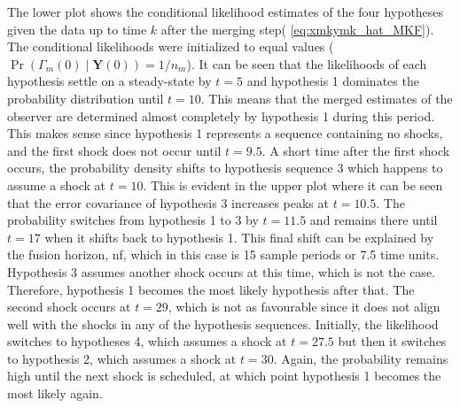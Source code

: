 The lower plot shows the conditional likelihood estimates of the four hypotheses given the data up to time $k$ after the merging step( \ref{eq:xmkymk_hat_MKF}). The conditional likelihoods were initialized to equal values ($\operatorname{Pr}\left(\Gamma_m(0) \mid \mathbf{Y}(0)\right)=1/n_m$). It can be seen that the likelihoods of each hypothesis settle on a steady-state by $t=5$ and hypothesis 1 dominates the probability distribution until $t=10$. This means that the merged estimates of the observer are determined almost completely by hypothesis 1 during this period. This makes sense since hypothesis 1 represents a sequence containing no shocks, and the first shock does not occur until $t=9.5$. A short time after the first shock occurs, the probability density shifts to hypothesis sequence 3 which happens to assume a shock at $t=10$. This is evident in the upper plot where it can be seen that the error covariance of hypothesis 3 increases peaks at $t=10.5$. The probability switches from hypothesis 1 to 3 by $t=11.5$ and remains there until $t=17$ when it shifts back to hypothesis 1. This final shift can be explained by the fusion horizon, \gls{nf}, which in this case is 15 sample periods or 7.5 time units. Hypothesis 3 assumes another shock occurs at this time, which is not the case. Therefore, hypothesis 1 becomes the most likely hypothesis after that. The second shock occurs at $t=29$, which is not as favourable since it does not align well with the shocks in any of the hypothesis sequences. Initially, the likelihood switches to hypotheses 4, which assumes a shock at $t=27.5$ but then it switches to hypothesis 2, which assumes a shock at $t=30$. Again, the probability remains high until the next shock is scheduled, at which point hypothesis 1 becomes the most likely again.

